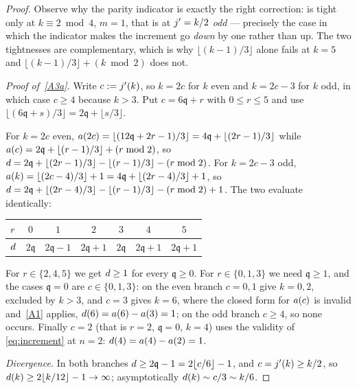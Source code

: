 \begin{proof}
Observe why the parity indicator is exactly the right correction:
 is tight only at $k \equiv 2 \bmod 4$, $m = 1$, that is at
$j' = k/2$ \emph{odd} --- precisely the case in which the indicator makes
the increment go \emph{down} by one rather than up. The two tightnesses are
complementary, which is why $\lfloor (k-1)/3\rfloor$ alone fails at $k = 5$
and $\lfloor (k-1)/3 \rfloor + (k \bmod 2)$ does not.

\emph{Proof of~\ref{A3a}.} Write $c := j'(k)$, so $k = 2c$ for $k$ even and
$k = 2c-3$ for $k$ odd, in which case $c \ge 4$ because $k > 3$. Put $c =
6\mathfrak{q} + r$ with $0 \le r \le 5$ and use $\lfloor (6\mathfrak{q}+s)/3
\rfloor = 2\mathfrak{q} + \lfloor s/3 \rfloor$.

For $k = 2c$ even, $a(2c) = \lfloor (12\mathfrak{q}+2r-1)/3\rfloor =
4\mathfrak{q} + \lfloor (2r-1)/3 \rfloor$ while $a(c) = 2\mathfrak{q} +
\lfloor (r-1)/3 \rfloor + (r \bmod 2)$, so
$d = 2\mathfrak{q} + \lfloor (2r-1)/3\rfloor - \lfloor (r-1)/3 \rfloor -
(r \bmod 2)$. For $k = 2c-3$ odd, $a(k) = \lfloor (2c-4)/3\rfloor + 1 =
4\mathfrak{q} + \lfloor (2r-4)/3 \rfloor + 1$, so $d = 2\mathfrak{q} +
\lfloor (2r-4)/3 \rfloor - \lfloor (r-1)/3\rfloor - (r \bmod 2) + 1$. The
two evaluate identically:

\begin{center}
\begin{tabular}{lcccccc}
\toprule
$r$ & $0$ & $1$ & $2$ & $3$ & $4$ & $5$ \\
\midrule
$d$ & $2\mathfrak{q}$ & $2\mathfrak{q}-1$ & $2\mathfrak{q}+1$
        & $2\mathfrak{q}$ & $2\mathfrak{q}+1$ & $2\mathfrak{q}+1$ \\
\bottomrule
\end{tabular}
\end{center}

For $r \in \{2,4,5\}$ we get $d \ge 1$ for every $\mathfrak{q} \ge 0$.
For $r \in \{0,1,3\}$ we need $\mathfrak{q} \ge 1$, and the cases
$\mathfrak{q} = 0$ are $c \in \{0,1,3\}$: on the even branch $c = 0,1$ give
$k = 0,2$, excluded by $k > 3$, and $c = 3$ gives $k = 6$, where the closed
form for $a(c)$ is invalid and~\ref{A1} applies, $d(6) = a(6) -
a(3) = 1$; on the odd branch $c \ge 4$, so none occurs. Finally $c = 2$
(that is $r = 2$, $\mathfrak{q} = 0$, $k = 4$) uses the validity of
\eqref{eq:increment} at $n = 2$: $d(4) = a(4) - a(2) = 1$.

\emph{Divergence.} In both branches $d \ge 2\mathfrak{q} - 1 = 2\lfloor
c/6 \rfloor - 1$, and $c = j'(k) \ge k/2$, so $d(k) \ge 2\lfloor k/12
\rfloor - 1 \to \infty$; asymptotically $d(k) \sim c/3 \sim k/6$.
\end{proof}

